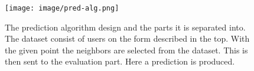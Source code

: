 \begin{figure}[H]
\centerline{\texttt{[image: image/pred-alg.png]}}
\caption[Prediction algorithm]{The prediction algorithm design and the parts it is separated into. The dataset consist of users on the form described in the top. With the given point the neighbors are selected from the dataset. This is then sent to the evaluation part. Here a prediction is produced.}
\label{figure:pred-alg}
\end{figure}
